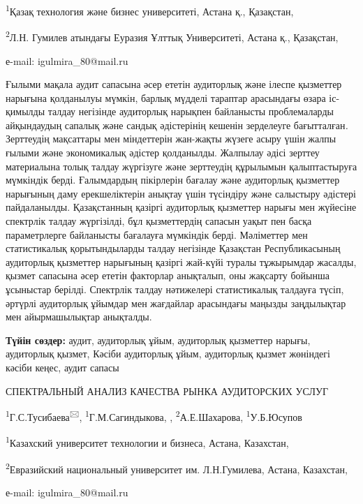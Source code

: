 \textsuperscript{1}Қазақ технология және бизнес университеті, Астана қ.,
Қазақстан,

\textsuperscript{2}Л.Н. Гумилев атындағы Еуразия Ұлттық Университеті,
Астана қ., Қазақстан,

е-mail: igulmira\_80@mail.ru

Ғылыми мақала аудит сапасына әсер ететін аудиторлық және ілеспе
қызметтер нарығына қолданылуы мүмкін, барлық мүдделі тараптар арасындағы
өзара іс-қимылды талдау негізінде аудиторлық нарықпен байланысты
проблемаларды айқындаудың сапалық және сандық әдістерінің кешенін
зерделеуге бағытталған\emph{.} Зерттеудің мақсаттары мен міндеттерін
жан-жақты жүзеге асыру үшін жалпы ғылыми және экономикалық әдістер
қолданылды. Жалпылау әдісі зерттеу материалына толық талдау жүргізуге
және зерттеудің құрылымын қалыптастыруға мүмкіндік берді. Ғалымдардың
пікірлерін бағалау және аудиторлық қызметтер нарығының даму
ерекшеліктерін анықтау үшін түсіндіру және салыстыру әдістері
пайдаланылды. Қазақстанның қазіргі аудиторлық қызметтер нарығы мен
жүйесіне спектрлік талдау жүргізілді, бұл қызметтердің сапасын уақыт пен
басқа параметрлерге байланысты бағалауға мүмкіндік берді. Мәліметтер мен
статистикалық қорытындыларды талдау негізінде Қазақстан Республикасының
аудиторлық қызметтер нарығының қазіргі жай-күйі туралы тұжырымдар
жасалды, қызмет сапасына әсер ететін факторлар анықталып, оны жақсарту
бойынша ұсыныстар берілді. Спектрлік талдау нәтижелері статистикалық
талдауға түсіп, әртүрлі аудиторлық ұйымдар мен жағдайлар арасындағы
маңызды заңдылықтар мен айырмашылықтар анықталды.

\textbf{Түйін сөздер:} аудит, аудиторлық ұйым, аудиторлық қызметтер
нарығы, аудиторлық қызмет, Кәсіби аудиторлық ұйым, аудиторлық қызмет
жөніндегі кәсіби кеңес, аудит сапасы

СПЕКТРАЛЬНЫЙ АНАЛИЗ КАЧЕСТВА РЫНКА АУДИТОРСКИХ УСЛУГ

\textsuperscript{1}Г.С.Тусибаева\textsuperscript{🖂},
\textsuperscript{1}Г.М.Сагиндыкова, , \textsuperscript{2}А.Е.Шахарова,
\textsuperscript{1}У.Б.Юсупов

\textsuperscript{1}Казахский университет технологии и бизнеса, Астана,
Казахстан,

\textsuperscript{2}Евразийский национальный университет им.
Л.Н.Гумилева, Астана, Казахстан,

е-mail: igulmira\_80@mail.ru

